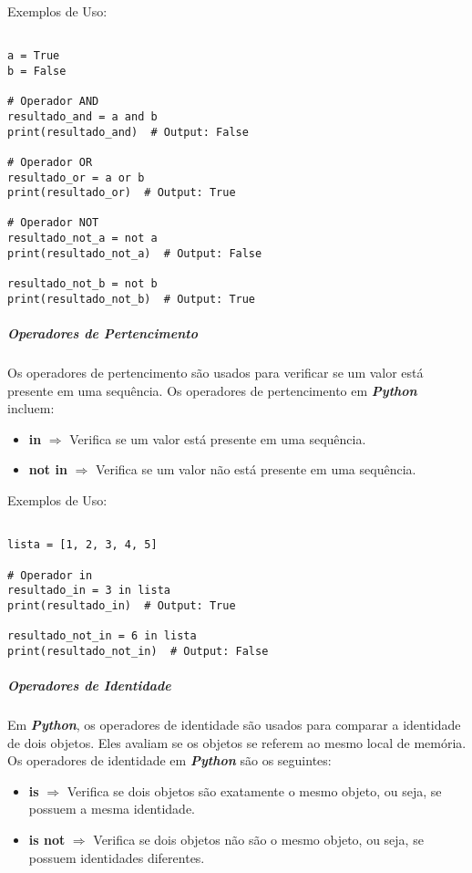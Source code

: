 \documentclass[a4paper, 12pt, onecolumn,singlespacing]{article}
\begin{document}
Exemplos de Uso:

\begin{verbatim}
	
a = True
b = False

# Operador AND
resultado_and = a and b
print(resultado_and)  # Output: False

# Operador OR
resultado_or = a or b
print(resultado_or)  # Output: True

# Operador NOT
resultado_not_a = not a
print(resultado_not_a)  # Output: False

resultado_not_b = not b
print(resultado_not_b)  # Output: True

\end{verbatim}


	\subparagraph{Operadores de Pertencimento}
	Os operadores de pertencimento são usados para verificar se um valor está presente em uma sequência. Os operadores de pertencimento em \textbf{\textit{Python}} incluem:

	\begin{itemize}
		\item \textbf{in} $\Rightarrow$ Verifica se um valor está presente em uma sequência.
		\item \textbf{not in} $\Rightarrow$ Verifica se um valor não está presente em uma sequência.
	\end{itemize}	

Exemplos de Uso:

\begin{verbatim}

lista = [1, 2, 3, 4, 5]

# Operador in
resultado_in = 3 in lista
print(resultado_in)  # Output: True

resultado_not_in = 6 in lista
print(resultado_not_in)  # Output: False

\end{verbatim}
	
	\subparagraph{Operadores de Identidade}
	
	Em \textbf{\textit{Python}}, os operadores de identidade são usados para comparar a identidade de dois objetos. Eles avaliam se os objetos se referem ao mesmo local de memória. Os operadores de identidade em \textbf{\textit{Python}} são os seguintes:
	
	\begin{itemize}
		\item \textbf{is} $\Rightarrow$ Verifica se dois objetos são exatamente o mesmo objeto, ou seja, se possuem a mesma identidade.
		\item \textbf{is not} $\Rightarrow$ Verifica se dois objetos não são o mesmo objeto, ou seja, se possuem identidades diferentes.
	\end{itemize}
	
\end{document}
